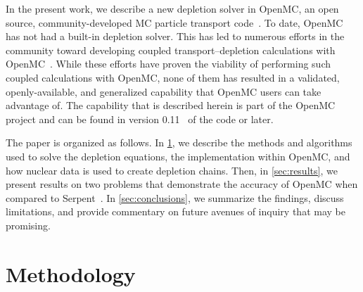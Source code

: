 \documentclass[3p,authoryear]{elsarticle}
\begin{document}
In the present work, we describe a new depletion solver in OpenMC, an open
source, community-developed MC particle transport code~\citep{romano2015ane1}.
To date, OpenMC has not had a built-in depletion solver. This has led to
numerous efforts in the community toward developing coupled transport--depletion
calculations with OpenMC~\citep{gul2017ane, lanversin2017icone,
lanversin2019phd, liu2019nst, zhuang2020pne, zhao2020ned, zhao2020cpc,
zhang2020ane}. While these efforts have proven the viability of performing such
coupled calculations with OpenMC, none of them has resulted in a validated,
openly-available, and generalized capability that OpenMC users can take
advantage of. The capability that is described herein is part of the OpenMC
project and can be found in version 0.11~\citep{openmc-0110} of the code or
later.

The paper is organized as follows. In \cref{sec:methods}, we describe the
methods and algorithms used to solve the depletion equations, the implementation
within OpenMC, and how nuclear data is used to create depletion chains. Then, in
\cref{sec:results}, we present results on two problems that demonstrate the
accuracy of OpenMC when compared to Serpent~\citep{leppanen2015ane}. In
\cref{sec:conclusions}, we summarize the findings, discuss limitations, and
provide commentary on future avenues of inquiry that may be promising.

\section{Methodology}
\label{sec:methods}
\end{document}
